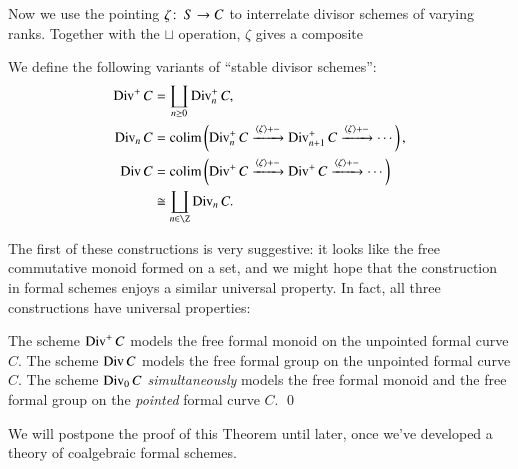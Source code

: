 Now we use the pointing $\zeta\colon\thinspace S \to C$ to interrelate divisor schemes of varying ranks.  Together with the $\sqcup$ operation, $\zeta$ gives a composite
\begin{center}
\end{center}

\begin{definition}\label{StableDivisorSchemeDefn}
We define the following variants of ``stable divisor schemes'':
\begin{align*}
\Div^+ C & = \coprod_{n \ge 0} \Div_n^+ C, \\
\Div_n C & = \colim \left( \Div_n^+ C \xrightarrow{\<\zeta\> + -} \Div_{n+1}^+ C \xrightarrow{\<\zeta\> + -} \cdots \right), \\
\Div C & = \colim \left( \Div^+ C \xrightarrow{\<\zeta\> + -} \Div^+ C \xrightarrow{\<\zeta\> + -} \cdots \right) \\
& \cong \coprod_{n \in \Z} \Div_n C.
\end{align*}
\end{definition}

\noindent The first of these constructions is very suggestive: it looks like the free commutative monoid formed on a set, and we might hope that the construction in formal schemes enjoys a similar universal property.  In fact, all three constructions have universal properties:

\begin{theorem}\label{DivConstructionsAreFree}
The scheme $\operatorname{Div}^+ C$ models the free formal monoid on the unpointed formal curve $C$.  The scheme $\operatorname{Div} C$ models the free formal group on the unpointed formal curve $C$.  The scheme $\operatorname{Div}_0 C$ \emph{simultaneously} models the free formal monoid and the free formal group on the \emph{pointed} formal curve $C$. \qed
\end{theorem}
\noindent We will postpone the proof of this Theorem until later, once we've developed a theory of coalgebraic formal schemes.

